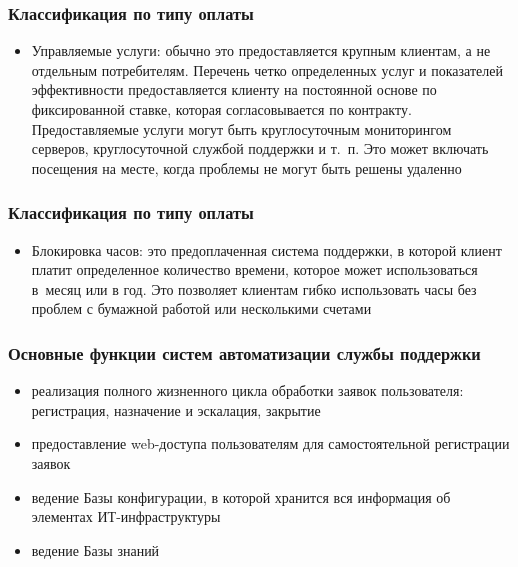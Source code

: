 \documentclass{../industrial-development}
\begin{document}
\begin{frame} \frametitle{Классификация по типу оплаты}
	\begin{itemize} 
        \item {Управляемые услуги}: обычно это предоставляется крупным клиентам, а не отдельным потребителям. Перечень четко определенных услуг и показателей эффективности предоставляется клиенту на постоянной основе по фиксированной ставке, которая согласовывается по контракту. Предоставляемые услуги могут быть круглосуточным мониторингом серверов, круглосуточной службой поддержки и т.~п. Это может включать посещения на месте, когда проблемы не могут быть решены удаленно
	\end{itemize}
\end{frame}

\begin{frame} \frametitle{Классификация по типу оплаты}
	\begin{itemize} 
        \item {Блокировка часов}: это предоплаченная система поддержки, в которой клиент платит определенное количество времени, которое может использоваться в~месяц или в год. Это позволяет клиентам гибко использовать часы без проблем с бумажной работой или несколькими счетами
	\end{itemize}
\end{frame}

\lecturenotes

\begin{frame} \frametitle{Основные функции систем автоматизации службы поддержки}
	\begin{itemize} 
		\item реализация полного жизненного цикла обработки заявок пользователя: регистрация, назначение и эскалация, закрытие
		\item предоставление web-доступа пользователям для самостоятельной регистрации заявок
		\item ведение Базы конфигурации, в которой хранится вся информация об элементах ИТ-инфраструктуры
		\item ведение Базы знаний
	\end{itemize}
\end{frame}
\lecturenotes
\end{document}

